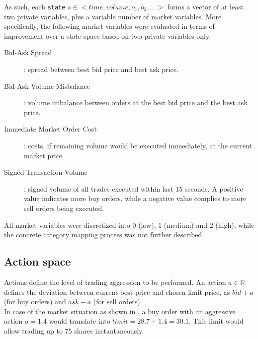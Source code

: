 As such, each \lstinline!state! $s \in <time, volume ,o_1, o_2, ...>$ forms a vector of at least two private variables, plus a variable number of market variables. More specifically, the following market variables were evaluated in terms of improvement over a state space based on two private variables only.
\begin{description}
\item[Bid-Ask Spread]: spread between best bid price and best ask price.
\item[Bid-Ask Volume Misbalance]: volume imbalance between orders at the best bid price and the best ask price.
\item[Immediate Market Order Cost]: costs, if remaining volume would be executed immediately, at the current market price.
\item[Signed Transaction Volume]: signed volume of all trades executed within last 15 seconds. A positive value indicates more buy orders, while a negative value complies to more sell orders being executed.
\end{description}

All market variables were discretized into 0 (low), 1 (medium) and 2 (high), while the concrete category mapping process was not further described.

\subsection{Action space}
\label{chap:actionspace}
Actions define the level of trading aggression to be performed. An action $a \in \mathbb{R}$ defines the deviation between current best price and chosen limit price, as $bid + a$ (for buy orders) and $ask - a$ (for sell orders).\\

In case of the market situation as shown in , a buy order with an aggressive action $a=1.4$ would translate into $limit=28.7+1.4=30.1$. This limit would allow trading up to 75 shares instantaneously.\\

